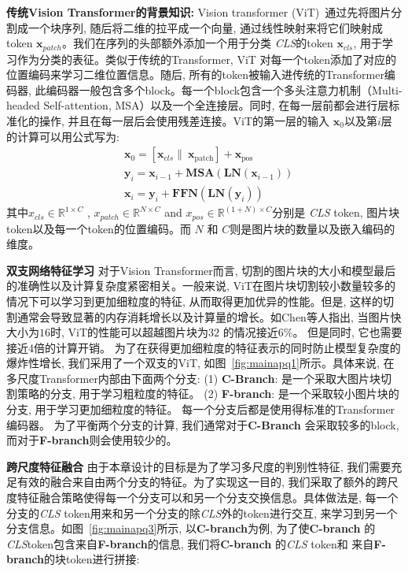 \textbf{传统Vision Transformer的背景知识:} Vision transformer (ViT)~\cite{dosovitskiy2020image}通过先将图片分割成一个块序列, 随后将二维的拉平成一个向量, 通过线性映射来将它们映射成token $\mathbf{x}_{patch}$。我们在序列的头部额外添加一个用于分类 \textit{CLS}的token $\mathbf{x}_{cls}$, 用于学习作为分类的表征。类似于传统的Transformer, ViT 对每一个token添加了对应的位置编码来学习二维位置信息。随后, 所有的token被输入进传统的Transformer编码器, 此编码器一般包含多个block。每一个block包含一个多头注意力机制（Multi-headed Self-attention, MSA）以及一个全连接层。同时, 在每一层前都会进行层标准化的操作, 并且在每一层后会使用残差连接。ViT的第一层的输入 $\mathbf{x}_0$以及第$i$层的计算可以用公式写为:
\begin{equation}
    \begin{aligned}
    &\mathbf{x}_{0}=\left[\mathbf{x}_{cls} \| \ \mathbf{x}_{\text{patch}}\right]+\mathbf{x}_{\text {pos }} \\
    &\mathbf{y}_{i}=\mathbf{x}_{i-1}+\mathbf{MSA}\left(\mathbf{LN}\left(\mathbf{x}_{i-1}\right)\right) \\
    &\mathbf{x}_{i}=\mathbf{y}_{i}+\mathbf{FFN}\left(\mathbf{LN}\left(\mathbf{y}_{i}\right)\right)
\end{aligned}
\end{equation}
其中$x_{cls} \in \mathbb{R}^{1\times C}$ , $x_{patch} \in \mathbb{R}^{N\times C}$ and $x_{pos} \in \mathbb{R}^{(1+N) \times C}$分别是 \textit{CLS} token, 图片块 token以及每一个token的位置编码。而 $N$ 和 $C$则是图片块的数量以及嵌入编码的维度。 \par
\textbf{双支网络特征学习}
对于Vision Transformer而言, 切割的图片块的大小和模型最后的准确性以及计算复杂度紧密相关。一般来说, ViT在图片块切割较小数量较多的情况下可以学习到更加细粒度的特征, 从而取得更加优异的性能。但是, 这样的切割通常会导致显著的内存消耗增长以及计算量的增长。如Chen等人\cite{chen2021crossvit}指出, 当图片快大小为$16$时, ViT的性能可以超越图片块为$32$ 的情况接近$6\%$。 但是同时, 它也需要接近4倍的计算开销。 为了在获得更加细粒度的特征表示的同时防止模型复杂度的爆炸性增长, 我们采用了一个双支的ViT, 如图~\ref{fig:mainapq1}所示。具体来说, 在多尺度Transformer内部由下面两个分支: (1)  \textbf{C-Branch}: 是一个采取大图片块切割策略的分支, 用于学习粗粒度的特征。 (2) \textbf{F-branch}: 是一个采取较小图片块的分支, 用于学习更加细粒度的特征。 每一个分支后都是使用得标准的Transformer 编码器。 为了平衡两个分支的计算, 我们通常对于\textbf{C-Branch} 会采取较多的block, 而对于\textbf{F-branch}则会使用较少的。\par
\textbf{跨尺度特征融合} \quad
由于本章设计的目标是为了学习多尺度的判别性特征, 我们需要充足有效的融合来自由两个分支的特征。为了实现这一目的, 我们采取了额外的跨尺度特征融合策略使得每一个分支可以和另一个分支交换信息。具体做法是, 每一个分支的\textit{CLS} token用来和另一个分支的除\textit{CLS}外的token进行交互, 来学习到另一个分支信息。如图~\ref{fig:mainapq3}所示, 以\textbf{C-branch}为例, 为了使\textbf{C-branch} 的\textit{CLS}token包含来自\textbf{F-branch}的信息, 我们将\textbf{C-branch} 的\textit{CLS} token和 来自\textbf{F-branch}的块token进行拼接:
